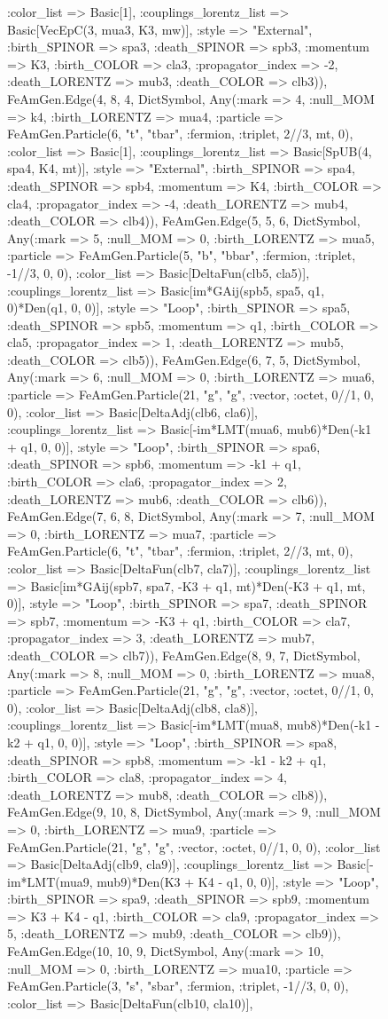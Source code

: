 \documentclass{revtex4}
\begin{document}
\begin{figure}[!htb]
\begin{center}
{:color_list => Basic[1], :couplings_lorentz_list => Basic[VecEpC(3, mua3, K3, mw)], :style => "External", :birth_SPINOR => spa3, :death_SPINOR => spb3, :momentum => K3, :birth_COLOR => cla3, :propagator_index => -2, :death_LORENTZ => mub3, :death_COLOR => clb3)), FeAmGen.Edge(4, 8, 4, Dict{Symbol, Any}(:mark => 4, :null_MOM => k4, :birth_LORENTZ => mua4, :particle => FeAmGen.Particle(6, "t", "tbar", :fermion, :triplet, 2//3, mt, 0), :color_list => Basic[1], :couplings_lorentz_list => Basic[SpUB(4, spa4, K4, mt)], :style => "External", :birth_SPINOR => spa4, :death_SPINOR => spb4, :momentum => K4, :birth_COLOR => cla4, :propagator_index => -4, :death_LORENTZ => mub4, :death_COLOR => clb4)), FeAmGen.Edge(5, 5, 6, Dict{Symbol, Any}(:mark => 5, :null_MOM => 0, :birth_LORENTZ => mua5, :particle => FeAmGen.Particle(5, "b", "bbar", :fermion, :triplet, -1//3, 0, 0), :color_list => Basic[DeltaFun(clb5, cla5)], :couplings_lorentz_list => Basic[im*GAij(spb5, spa5, q1, 0)*Den(q1, 0, 0)], :style => "Loop", :birth_SPINOR => spa5, :death_SPINOR => spb5, :momentum => q1, :birth_COLOR => cla5, :propagator_index => 1, :death_LORENTZ => mub5, :death_COLOR => clb5)), FeAmGen.Edge(6, 7, 5, Dict{Symbol, Any}(:mark => 6, :null_MOM => 0, :birth_LORENTZ => mua6, :particle => FeAmGen.Particle(21, "g", "g", :vector, :octet, 0//1, 0, 0), :color_list => Basic[DeltaAdj(clb6, cla6)], :couplings_lorentz_list => Basic[-im*LMT(mua6, mub6)*Den(-k1 + q1, 0, 0)], :style => "Loop", :birth_SPINOR => spa6, :death_SPINOR => spb6, :momentum => -k1 + q1, :birth_COLOR => cla6, :propagator_index => 2, :death_LORENTZ => mub6, :death_COLOR => clb6)), FeAmGen.Edge(7, 6, 8, Dict{Symbol, Any}(:mark => 7, :null_MOM => 0, :birth_LORENTZ => mua7, :particle => FeAmGen.Particle(6, "t", "tbar", :fermion, :triplet, 2//3, mt, 0), :color_list => Basic[DeltaFun(clb7, cla7)], :couplings_lorentz_list => Basic[im*GAij(spb7, spa7, -K3 + q1, mt)*Den(-K3 + q1, mt, 0)], :style => "Loop", :birth_SPINOR => spa7, :death_SPINOR => spb7, :momentum => -K3 + q1, :birth_COLOR => cla7, :propagator_index => 3, :death_LORENTZ => mub7, :death_COLOR => clb7)), FeAmGen.Edge(8, 9, 7, Dict{Symbol, Any}(:mark => 8, :null_MOM => 0, :birth_LORENTZ => mua8, :particle => FeAmGen.Particle(21, "g", "g", :vector, :octet, 0//1, 0, 0), :color_list => Basic[DeltaAdj(clb8, cla8)], :couplings_lorentz_list => Basic[-im*LMT(mua8, mub8)*Den(-k1 - k2 + q1, 0, 0)], :style => "Loop", :birth_SPINOR => spa8, :death_SPINOR => spb8, :momentum => -k1 - k2 + q1, :birth_COLOR => cla8, :propagator_index => 4, :death_LORENTZ => mub8, :death_COLOR => clb8)), FeAmGen.Edge(9, 10, 8, Dict{Symbol, Any}(:mark => 9, :null_MOM => 0, :birth_LORENTZ => mua9, :particle => FeAmGen.Particle(21, "g", "g", :vector, :octet, 0//1, 0, 0), :color_list => Basic[DeltaAdj(clb9, cla9)], :couplings_lorentz_list => Basic[-im*LMT(mua9, mub9)*Den(K3 + K4 - q1, 0, 0)], :style => "Loop", :birth_SPINOR => spa9, :death_SPINOR => spb9, :momentum => K3 + K4 - q1, :birth_COLOR => cla9, :propagator_index => 5, :death_LORENTZ => mub9, :death_COLOR => clb9)), FeAmGen.Edge(10, 10, 9, Dict{Symbol, Any}(:mark => 10, :null_MOM => 0, :birth_LORENTZ => mua10, :particle => FeAmGen.Particle(3, "s", "sbar", :fermion, :triplet, -1//3, 0, 0), :color_list => Basic[DeltaFun(clb10, cla10)], }
\end{center}
\end{figure}
\end{document}

